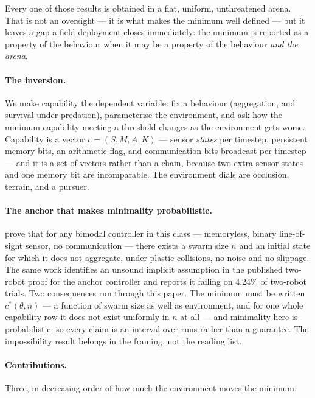\documentclass[11pt,a4paper]{article}
\begin{document}
Every one of those results is obtained in a flat, uniform, unthreatened arena.
That is not an oversight --- it is what makes the minimum well defined --- but it
leaves a gap a field deployment closes immediately: the minimum is reported as a
property of the behaviour when it may be a property of the behaviour \emph{and
the arena}.

\paragraph{The inversion.} We make capability the dependent variable: fix a
behaviour (aggregation, and survival under predation), parameterise the
environment, and ask how the minimum capability meeting a threshold changes as
the environment gets worse. Capability is a vector $c = (S, M, A, K)$ ---
sensor \emph{states} per timestep, persistent memory bits, an arithmetic flag,
and communication bits broadcast per timestep --- and it is a set of vectors rather than a
chain, because two extra sensor states and one memory bit are incomparable. The environment dials are occlusion, terrain, and a pursuer.

\paragraph{The anchor that makes minimality probabilistic.}
\citet{steinberg2025} prove that for any bimodal controller in this class ---
memoryless, binary line-of-sight sensor, no communication --- there exists a
swarm size $n$ and an initial state for which it does not aggregate, under
plastic collisions, no noise and no slippage. The same work identifies an
unsound implicit assumption in the published two-robot proof for the anchor
controller and reports it failing on 4.24\% of two-robot trials. Two consequences run through this paper.
The minimum must be written $c^*(\theta, n)$ --- a function of swarm size as well
as environment, and for one whole capability row it does not exist uniformly in
$n$ at all --- and minimality here is probabilistic, so every claim is an interval
over runs rather than a guarantee. The impossibility result belongs in the framing, not the
reading list.

\paragraph{Contributions.} Three, in decreasing order of how much the
environment moves the minimum.
\end{document}
